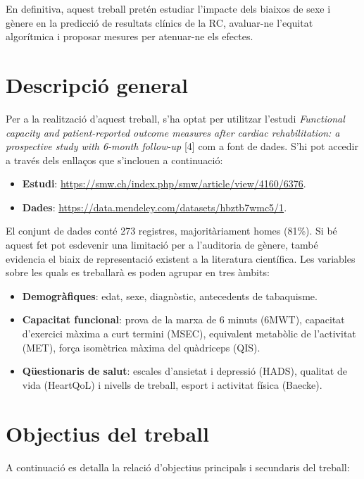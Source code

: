 \documentclass[CAT]{TFUOC}%
\begin{document}
En definitiva, aquest treball pretén estudiar l'impacte dels biaixos de sexe i gènere en la predicció de resultats clínics de la RC, avaluar-ne l'equitat algorítmica i proposar mesures per atenuar-ne els efectes.

\section{Descripció general}\label{descripciuxf3-general}

Per a la realització d'aquest treball, s'ha optat per utilitzar l'estudi \emph{Functional capacity and patient-reported outcome measures after cardiac rehabilitation: a prospective study with 6-month follow-up} {[}4{]} com a font de dades. S'hi pot accedir a través dels enllaços que s'inclouen a continuació:

\begin{itemize}
\item
  \textbf{Estudi}: \url{https://smw.ch/index.php/smw/article/view/4160/6376}.
\item
  \textbf{Dades}: \url{https://data.mendeley.com/datasets/hbztb7wmc5/1}.
\end{itemize}

El conjunt de dades conté 273 registres, majoritàriament homes (81\%). Si bé aquest fet pot esdevenir una limitació per a l'auditoria de gènere, també evidencia el biaix de representació existent a la literatura científica. Les variables sobre les quals es treballarà es poden agrupar en tres àmbits:

\begin{itemize}
\item
  \textbf{Demogràfiques}: edat, sexe, diagnòstic, antecedents de tabaquisme.
\item
  \textbf{Capacitat funcional}: prova de la marxa de 6 minuts (6MWT), capacitat d'exercici màxima a curt termini (MSEC), equivalent metabòlic de l'activitat (MET), força isomètrica màxima del quàdriceps (QIS).
\item
  \textbf{Qüestionaris de salut}: escales d'ansietat i depressió (HADS), qualitat de vida (HeartQoL) i nivells de treball, esport i activitat física (Baecke).
\end{itemize}

\section{Objectius del treball}\label{objectius-del-treball}

A continuació es detalla la relació d'objectius principals i secundaris del treball:
\end{document}
